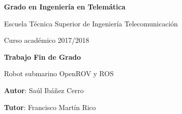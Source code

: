 \documentclass[twoside,a4paper,12pt,openany]{book}
\begin{document}
\thispagestyle{empty}

\baselineskip

\vspace{2cm}

\begin{figure}[htb]
  \centerline{}
\end{figure}

\begin{center}
  {\Large {\bf Grado en Ingeniería en Telemática}}
  \vspace{5mm}
 
  {\large {Escuela Técnica Superior de Ingeniería Telecomunicación}}
  \vspace{5mm}

  {\large {Curso académico 2017/2018}}

  \vspace{1cm}

  {\large {\bf Trabajo Fin de Grado}}

  \vspace{2cm}

  {\large {Robot submarino OpenROV y ROS\\[1cm] }}

  \vspace{5cm}
  {\bf Autor}: Saúl Ibáñez Cerro
  
  {\bf Tutor}: Francisco Martín Rico 
\end{center}

\clearpage
\newpage{\pagestyle{empty}\cleardoublepage}
\thispagestyle{empty}

\vspace{5cm}
\end{document}
